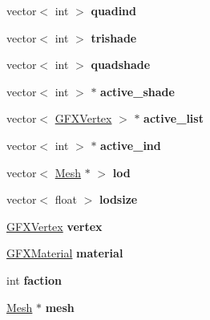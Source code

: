 \begin{DoxyCompactItemize}
\item 
vector$<$ int $>$ {\bfseries quadind}\hypertarget{structMeshXML_a77565dea01472b8dff62c1b9c17b3b09}{}\label{structMeshXML_a77565dea01472b8dff62c1b9c17b3b09}

\item 
vector$<$ int $>$ {\bfseries trishade}\hypertarget{structMeshXML_a6567ce663d4a54fcd82c59664d073df8}{}\label{structMeshXML_a6567ce663d4a54fcd82c59664d073df8}

\item 
vector$<$ int $>$ {\bfseries quadshade}\hypertarget{structMeshXML_af0fcde4d68952ed78b1a076c6751ecc3}{}\label{structMeshXML_af0fcde4d68952ed78b1a076c6751ecc3}

\item 
vector$<$ int $>$ $\ast$ {\bfseries active\+\_\+shade}\hypertarget{structMeshXML_a8824f71eafc875fd79eab971c7e8ef4f}{}\label{structMeshXML_a8824f71eafc875fd79eab971c7e8ef4f}

\item 
vector$<$ \hyperlink{structGFXVertex}{G\+F\+X\+Vertex} $>$ $\ast$ {\bfseries active\+\_\+list}\hypertarget{structMeshXML_a30bb3b0c6663db0c719b1935b4e63eb6}{}\label{structMeshXML_a30bb3b0c6663db0c719b1935b4e63eb6}

\item 
vector$<$ int $>$ $\ast$ {\bfseries active\+\_\+ind}\hypertarget{structMeshXML_ad9aaa53b761729b75b5eab605dad4280}{}\label{structMeshXML_ad9aaa53b761729b75b5eab605dad4280}

\item 
vector$<$ \hyperlink{classMesh}{Mesh} $\ast$ $>$ {\bfseries lod}\hypertarget{structMeshXML_a5ea7815d6dafa686cca6e95f53cd4587}{}\label{structMeshXML_a5ea7815d6dafa686cca6e95f53cd4587}

\item 
vector$<$ float $>$ {\bfseries lodsize}\hypertarget{structMeshXML_ae921f6ef4e5e22ab8cab6791ef9887e5}{}\label{structMeshXML_ae921f6ef4e5e22ab8cab6791ef9887e5}

\item 
\hyperlink{structGFXVertex}{G\+F\+X\+Vertex} {\bfseries vertex}\hypertarget{structMeshXML_a306e8d5493bed942b71f056ca7445740}{}\label{structMeshXML_a306e8d5493bed942b71f056ca7445740}

\item 
\hyperlink{structGFXMaterial}{G\+F\+X\+Material} {\bfseries material}\hypertarget{structMeshXML_a6400ebc2a8d01335afc47c29b0241a9a}{}\label{structMeshXML_a6400ebc2a8d01335afc47c29b0241a9a}

\item 
int {\bfseries faction}\hypertarget{structMeshXML_a62ef5a007f080f70f0198d202236ae6a}{}\label{structMeshXML_a62ef5a007f080f70f0198d202236ae6a}

\item 
\hyperlink{classMesh}{Mesh} $\ast$ {\bfseries mesh}\hypertarget{structMeshXML_ae0b66da4b3053ea8617b8b093e962aa1}{}\label{structMeshXML_ae0b66da4b3053ea8617b8b093e962aa1}

\end{DoxyCompactItemize}
